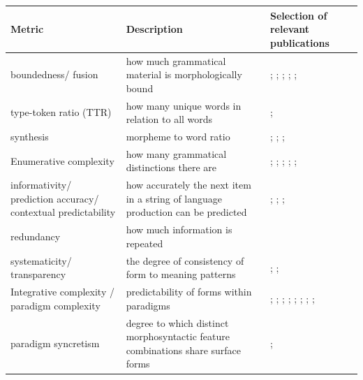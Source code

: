\documentclass[USenglish]{article}
\begin{document}
\begin{table}[ht]
    \centering
    \begin{tabular}{p{2.2cm}p{4cm}p{6cm}}  %
        \toprule
        \textbf{Metric} & \textbf{Description}  & \textbf{Selection of relevant publications} \\ 
        \midrule
boundedness/ fusion   & how much grammatical material is morphologically bound &  \citet{sapir_introduction_1921}; \citet{greenberg_quantitative_1960}; \citet{bybee_morphology_1985}; \cite{skirgard_grambank_2023-1}; \cite{shcherbakova2023societies}; \citet{lupyandale2010} \\ 
         \midrule
        type-token ratio (TTR) & how many unique words in relation to all words  & \cite{kettunen2014can}; \citet{ccoltekin2023complexity}\\ 
               \midrule
 synthesis & morpheme to word ratio  & \citet{sapir_introduction_1921}; \citet{greenberg_quantitative_1960}; \citet{bybee_morphology_1985}; \citet{easterday_syllable_2021} \\
                     \midrule
     Enumerative complexity  & how many grammatical distinctions there are  & \citet{greenberg_quantitative_1960}; \cite{ackerman_morphological_2013}; \cite{shcherbakova2023societies};  \cite{skirgard_grambank_2023-1}; \citet{lupyandale2010}; \citet{ccoltekin2023complexity}\\
\midrule
informativity/ prediction accuracy/ contextual predictability  & how accurately the next item in a string of language production can be predicted & \cite{frank2011insensitivity}; \citet{cohen-priva_phone_2008}; \citet{levshina_frequency_2022}; \citet{cotterell_are_2020} \\    \midrule
redundancy  & how much information is repeated & \cite{leufkens2023measuring}\\    \midrule
systematicity/ transparency  & the degree of consistency of form to meaning patterns & \cite{raviv2019larger}; \cite{hengeveld2018transparent}; \citet{bybee_morphology_1985} \\    \midrule
Integrative complexity / paradigm complexity & predictability of forms within paradigms &  \citet{bybee_morphology_1985}; \cite{round_cognition_2022}; \cite{ackerman_parts_2009}; \citet{ackerman_morphological_2013}; \cite{cotterell2019complexity}; \citet{sagot_comparing_2013}; \citet{moscoso_del_prado_martin_putting_2004}; \citet{beniamine_one_2021}; \citet{bonami_joint_2016}\\    \midrule
paradigm syncretism &  degree to which distinct morphosyntactic feature combinations share surface forms & \citet{quinn_evolutionary_2025}; \citet{bonami_joint_2016}  \\    \midrule

\end{tabular}
\end{table}
\end{document}
